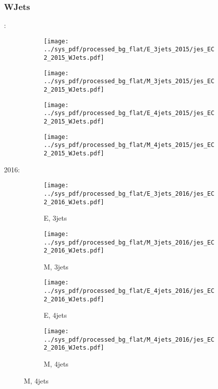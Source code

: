 \documentclass{beamer}
\begin{document}
\begin{frame}
\frametitle{WJets}
\fontsize{5}{1}:
\begin{figure}
\centering
\begin{subfigure}[b]{0.24\textwidth}
\texttt{[image: ../sys\_pdf/processed\_bg\_flat/E\_3jets\_2015/jes\_EC2\_2015\_WJets.pdf]}
\end{subfigure}
\begin{subfigure}[b]{0.24\textwidth}
\texttt{[image: ../sys\_pdf/processed\_bg\_flat/M\_3jets\_2015/jes\_EC2\_2015\_WJets.pdf]}
\end{subfigure}
\begin{subfigure}[b]{0.24\textwidth}
\texttt{[image: ../sys\_pdf/processed\_bg\_flat/E\_4jets\_2015/jes\_EC2\_2015\_WJets.pdf]}
\end{subfigure}
\begin{subfigure}[b]{0.24\textwidth}
\texttt{[image: ../sys\_pdf/processed\_bg\_flat/M\_4jets\_2015/jes\_EC2\_2015\_WJets.pdf]}
\end{subfigure}
\end{figure}
2016:
\begin{figure}
\centering
\begin{subfigure}[b]{0.24\textwidth}
\texttt{[image: ../sys\_pdf/processed\_bg\_flat/E\_3jets\_2016/jes\_EC2\_2016\_WJets.pdf]}
\captionsetup{font=tiny}
\caption{E, 3jets}
\end{subfigure}
\begin{subfigure}[b]{0.24\textwidth}
\texttt{[image: ../sys\_pdf/processed\_bg\_flat/M\_3jets\_2016/jes\_EC2\_2016\_WJets.pdf]}
\captionsetup{font=tiny}
\caption{M, 3jets}
\end{subfigure}
\begin{subfigure}[b]{0.24\textwidth}
\texttt{[image: ../sys\_pdf/processed\_bg\_flat/E\_4jets\_2016/jes\_EC2\_2016\_WJets.pdf]}
\captionsetup{font=tiny}
\caption{E, 4jets}
\end{subfigure}
\begin{subfigure}[b]{0.24\textwidth}
\texttt{[image: ../sys\_pdf/processed\_bg\_flat/M\_4jets\_2016/jes\_EC2\_2016\_WJets.pdf]}
\captionsetup{font=tiny}
\caption{M, 4jets}
\end{subfigure}
\end{figure}
\end{frame}
\end{document}
